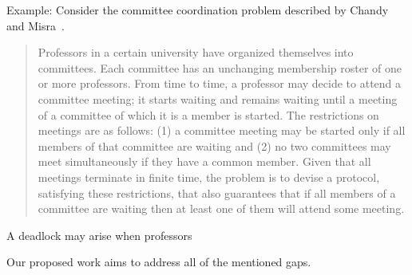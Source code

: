 Example: 
Consider the committee coordination problem described by Chandy and Misra~\cite{MisraCommittee}. 

\begin{quote}
  Professors in a certain university
  have organized themselves into committees.
  Each committee has an unchanging membership
  roster of one or more professors. From
  time to time, a professor may decide to attend
  a committee meeting; it starts waiting
  and remains waiting until a meeting of a committee
  of which it is a member is started.
  The restrictions on meetings are as follows:
  (1) a committee meeting may be started only
  if all members of that committee are waiting
  and (2) no two committees may meet simultaneously
  if they have a common member. 
  Given that all meetings terminate in finite
  time, the problem is to devise a protocol,
  satisfying these restrictions, that also guarantees
  that if all members of a committee are
  waiting then at least one of them will attend
  some meeting.
\end{quote}

A deadlock may arise when professors 

Our proposed work aims to address all of the mentioned gaps. 

